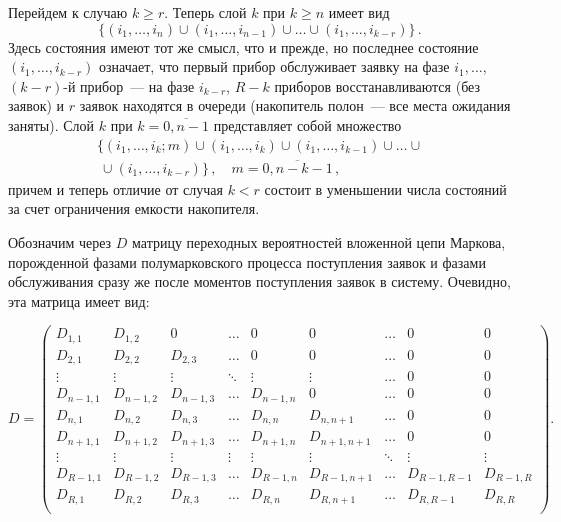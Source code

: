 \begin{multicols}{2}
Перейдем к случаю $k\geq r$.
Теперь слой $k$ при $k \geq n$ имеет вид
$$
\{(i_1,\ldots,i_n) \cup
(i_1,\ldots,i_{n-1})
\cup \ldots \cup
(i_1,\ldots,i_{k-r})\}\,.
$$
Здесь состояния имеют тот же смысл, что и преж\-де, но последнее
состояние $(i_1,\ldots,i_{k-r})$ означает, что первый прибор обслуживает
заявку на фазе $i_1,\ldots,$ $(k-r)$-й прибор~--- на фазе $i_{k-r}$,
$R-k$ приборов восстанавливаются (без заявок) и $r$ заявок находятся
в очереди (накопитель полон~--- все мес\-та ожидания заняты).
Слой $k$ при $k=\overline{0,n-1}$ представляет собой множество
\begin{multline*}
\!\!\{(i_1,\ldots,i_k;m) \cup
(i_1,\ldots,i_k) \cup
(i_1,\ldots,i_{k-1})
\cup \ldots \cup\\
\ \cup
(i_1,\ldots,i_{k-r})\}\,,
\quad m=\overline{0,n-k-1}\,,
\end{multline*}
причем и теперь отличие от случая $k< r$ состоит в уменьшении числа
состояний за счет ограничения емкости накопителя.

Обозначим через $D$ матрицу переходных вероятностей вложенной цепи Маркова, 
порожденной фазами полумарковского процесса поступления заявок и фазами 
обслуживания сразу же после моментов поступления заявок в систему. Очевидно, 
эта матрица имеет вид:

\end{multicols}
\smallskip
\noindent
$$
D=
  \begin{pmatrix}
D_{1,1}      & D_{1,2}      &  0          & \ldots &  0         &  0
               & \ldots & 0 & 0    \\
D_{2,1}      & D_{2,2}      & D_{2,3}      & \ldots &  0         &  0
               & \ldots & 0 & 0    \\
\vdots      & \vdots      & \vdots      & \ddots & \vdots     & \vdots
               & \ldots & 0 & 0 \\
D_{n-1,1}   & D_{n-1,2}   & D_{n-1,3}   & \ldots & D_{n-1,n}  &  0
               & \ldots & 0 & 0    \\
D_{n,1}      & D_{n,2}      & D_{n,3}      & \ldots & D_{n,n}     &
D_{n,n+1}
               & \ldots & 0 & 0  \\
D_{n+1,1}   & D_{n+1,2}   & D_{n+1,3}   & \ldots & D_{n+1,n}  & D_{n+1,n+1}
               & \ldots & 0 & 0  \\
\vdots      & \vdots      & \vdots      & \vdots & \vdots      & \vdots
               & \ddots & \vdots &\vdots  \\
D_{R-1,1} & D_{R-1,2} & D_{R-1,3} & \ldots & D_{R-1,n} & D_{R-1,n+1}
               & \ldots & D_{R-1,R-1}  & D_{R-1,R} \\
D_{R,1}   & D_{R,2}   & D_{R,3}   & \ldots & D_{R,n}   & D_{R,n+1}
               & \ldots & D_{R,R-1}  & D_{R,R} \\
\end{pmatrix}.
$$
